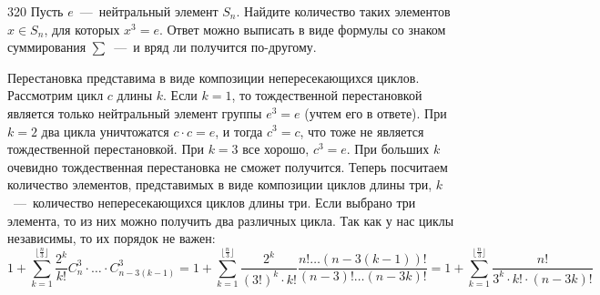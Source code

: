 \begin{task}{320}
	Пусть $e$~---~нейтральный элемент $S_n$. Найдите количество таких элементов $x \in S_n$, для которых $x^3 = e$. Ответ можно выписать в виде формулы со знаком суммирования $\sum$~---~и вряд ли получится по-другому.
\end{task}

\begin{solution} 
	Перестановка представима в виде композиции непересекающихся циклов. Рассмотрим цикл  $c$ длины $k$. Если $k = 1$, то тождественной перестановкой является только нейтральный элемент группы $e^3 = e$ (учтем его в ответе). При $k = 2$ два цикла уничтожатся $c \cdot c = e$, и тогда $c^3 = c$, что тоже не является тождественной перестановкой. При $k = 3$ все хорошо, $c^3 = e$. При больших $k$ очевидно тождественная перестановка не сможет получится. Теперь посчитаем количество элементов, представимых в виде композиции циклов длины три, $k$~---~количество непересекающихся циклов длины три. Если выбрано три элемента, то из них можно получить два различных цикла. Так как у нас циклы независимы, то их порядок не важен:
	\[1 + \sum_{k = 1}^{\lfloor\frac{n}{3}\rfloor} \dfrac{2^k}{k!} C_n^3 \cdot \ldots \cdot C_{n - 3(k - 1)}^3 = 1 +  \sum_{k = 1}^{\lfloor\frac{n}{3}\rfloor}\dfrac{2^k}{(3!)^k \cdot k!} \dfrac{n! \ldots (n - 3(k-1))!}{(n-3)! \ldots (n-3k)!} = 1 + \sum_{k = 1}^{\lfloor\frac{n}{3}\rfloor} \dfrac{n!}{3^k \cdot k! \cdot (n-3k)!}\]
\end{solution}